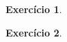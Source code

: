 \documentclass[letter,11pt]{article}
\newtheorem{exer}{Exercício}
\newcommand{\E}{\mathbb {E}}
\newcommand{\eqm}{\mbox{EQM}}
\newcommand{\var}{\mathrm{Var}}
\newcommand{\te}{\theta}
\renewcommand{\th}{\hat\theta}
\begin{document}
\begin{exer} \rm
\begin{enumerate}
\end{enumerate}
\end{exer}


\begin{exer} \rm
\begin{enumerate}
\end{enumerate}
\end{exer}
\end{document}
